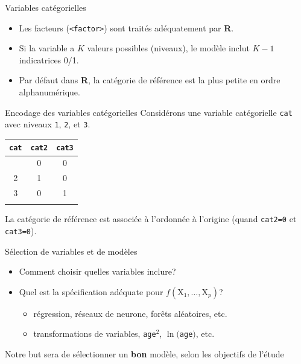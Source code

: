 \documentclass[
  ignorenonframetext,
]{beamer}
\providecommand{\tightlist}{%
  \setlength{\itemsep}{0pt}\setlength{\parskip}{0pt}}\usepackage{longtable,booktabs,array}
\begin{document}
\begin{frame}[fragile]{Variables catégorielles}
\label{variables-catuxe9gorielles}
\begin{itemize}
\tightlist
\item
  Les facteurs (\texttt{\textless{}factor\textgreater{}}) sont traités
  adéquatement par \textbf{R}.
\item
  Si la variable a \(K\) valeurs possibles (niveaux), le modèle inclut
  \(K-1\) indicatrices 0/1.
\item
  Par défaut dans \textbf{R}, la catégorie de référence est la plus
  petite en ordre alphanumérique.
\end{itemize}
\end{frame}

\begin{frame}[fragile]{Encodage des variables catégorielles}
\label{encodage-des-variables-catuxe9gorielles}
Considérons une variable catégorielle \texttt{cat} avec niveaux
\texttt{1}, \texttt{2}, et \texttt{3}.

\begin{longtable}[]{@{}ccc@{}}
\toprule\noalign{}
\texttt{cat} & \texttt{cat2} & \texttt{cat3} \\
\midrule\noalign{}
\endhead
1 & 0 & 0 \\
2 & 1 & 0 \\
3 & 0 & 1 \\
\bottomrule\noalign{}
\end{longtable}

La catégorie de référence est associée à l'ordonnée à l'origine (quand
\texttt{cat2=0} et \texttt{cat3=0}).
\end{frame}

\begin{frame}[fragile]{Sélection de variables et de modèles}
\label{suxe9lection-de-variables-et-de-moduxe8les}
\begin{itemize}
\tightlist
\item
  Comment choisir quelles variables inclure?
\item
  Quel est la spécification adéquate pour
  \(f(\mathrm{X}_1, \ldots, \mathrm{X}_p)\)?

  \begin{itemize}
  \tightlist
  \item
    régression, réseaux de neurone, forêts aléatoires, etc.
  \item
    transformations de variables, \texttt{age}\({}^2\),
    \(\ln(\)\texttt{age}\()\), etc.
  \end{itemize}
\end{itemize}

Notre but sera de sélectionner un \textbf{bon} modèle, selon les
objectifs de l'étude
\end{frame}
\end{document}
